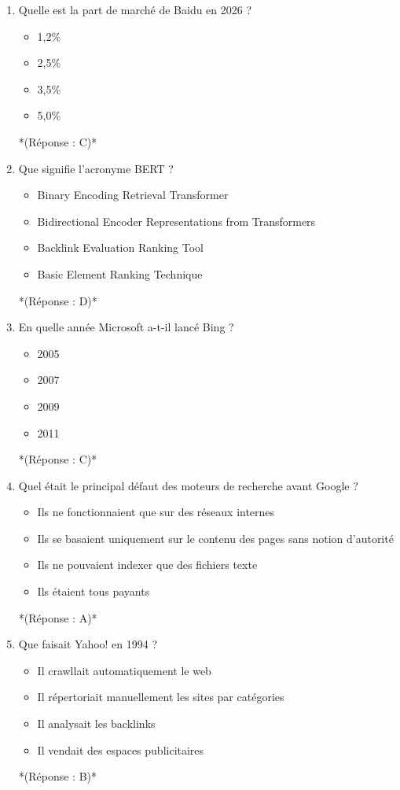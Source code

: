 \documentclass[12pt,a4paper,twoside]{report}
\begin{document}
\begin{enumerate}
\item Quelle est la part de marché de Baidu en 2026 ?
\begin{itemize}
\item[A)] 1,2\%
\item[B)] 2,5\%
\item[C)] 3,5\%
\item[D)] 5,0\%
\end{itemize}
*(Réponse : C)*

\item Que signifie l'acronyme BERT ?
\begin{itemize}
\item[A)] Binary Encoding Retrieval Transformer
\item[B)] Bidirectional Encoder Representations from Transformers
\item[C)] Backlink Evaluation Ranking Tool
\item[D)] Basic Element Ranking Technique
\end{itemize}
*(Réponse : D)*

\item En quelle année Microsoft a-t-il lancé Bing ?
\begin{itemize}
\item[A)] 2005
\item[B)] 2007
\item[C)] 2009
\item[D)] 2011
\end{itemize}
*(Réponse : C)*

\item Quel était le principal défaut des moteurs de recherche avant Google ?
\begin{itemize}
\item[A)] Ils ne fonctionnaient que sur des réseaux internes
\item[B)] Ils se basaient uniquement sur le contenu des pages sans notion d'autorité
\item[C)] Ils ne pouvaient indexer que des fichiers texte
\item[D)] Ils étaient tous payants
\end{itemize}
*(Réponse : A)*

\item Que faisait Yahoo! en 1994 ?
\begin{itemize}
\item[A)] Il crawllait automatiquement le web
\item[B)] Il répertoriait manuellement les sites par catégories
\item[C)] Il analysait les backlinks
\item[D)] Il vendait des espaces publicitaires
\end{itemize}
*(Réponse : B)*


\end{enumerate}
\end{document}
